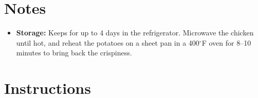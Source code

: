 \section*{Notes}

\begin{itemize}
      \item \textbf{Storage:} Keeps for up to 4 days in the refrigerator. Microwave the chicken until hot, and reheat the potatoes on a sheet pan in a 400$^\circ$F oven for 8--10 minutes to bring back the crispiness.
\end{itemize}

\newpage
{}
\section*{Instructions}

